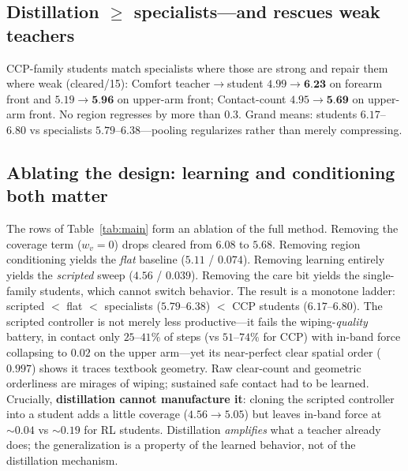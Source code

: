 \documentclass[conference]{IEEEtran}
\newcommand{\best}[1]{\textbf{#1}}
\begin{document}
\subsection{Distillation $\geq$ specialists---and rescues weak teachers}
CCP-family students match specialists where those are strong and repair them where weak
(cleared/15): Comfort teacher$\to$student $4.99\to\best{6.23}$ on forearm front and
$5.19\to\best{5.96}$ on upper-arm front; Contact-count $4.95\to\best{5.69}$ on upper-arm front.
No region regresses by more than $0.3$. Grand means: students $6.17$--$6.80$ vs specialists
$5.79$--$6.38$---pooling regularizes rather than merely compressing.

\subsection{Ablating the design: learning and conditioning both matter}
\label{sec:ladder}
The rows of Table~\ref{tab:main} form an ablation of the full method. Removing the coverage
term ($w_v{=}0$) drops cleared from $6.08$ to $5.68$. Removing region conditioning yields the
\emph{flat} baseline ($5.11$ / $0.074$). Removing learning entirely yields the \emph{scripted}
sweep ($4.56$ / $0.039$). Removing the care bit yields the single-family students, which cannot
switch behavior. The result is a monotone ladder: scripted $<$ flat $<$ specialists
($5.79$--$6.38$) $<$ CCP students ($6.17$--$6.80$). The scripted controller is not merely less
productive---it fails the wiping-\emph{quality} battery, in contact only $25$--$41\%$ of steps
(vs $51$--$74\%$ for CCP) with in-band force collapsing to $0.02$ on the upper arm---yet its
near-perfect clear spatial order ($0.997$) shows it traces textbook geometry. Raw clear-count
and geometric orderliness are mirages of wiping; sustained safe contact had to be learned.
Crucially, \textbf{distillation cannot manufacture it}: cloning the scripted controller into a
student adds a little coverage ($4.56\to5.05$) but leaves in-band force at ${\sim}0.04$ vs
${\sim}0.19$ for RL students. Distillation \emph{amplifies} what a teacher already does; the
generalization is a property of the learned behavior, not of the distillation mechanism.
\end{document}
